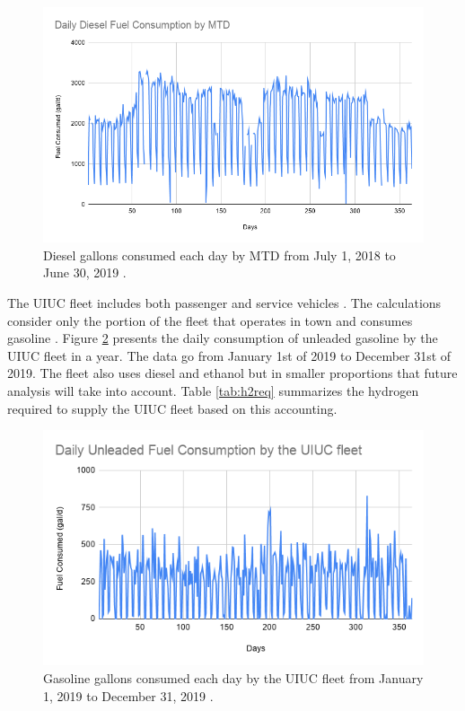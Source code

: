 \documentclass{anstrans}
\begin{document}
\begin{figure}[H]
	\centering
	\includegraphics[width=1.05\linewidth]{figures/mtd-fuel-consumption.png}
	\hfill
	\caption{Diesel gallons consumed each day by MTD from July 1, 2018 to June 30, 2019 \cite{mtd_irecords_2019}.}
	\label{fig:mtdfuel}
\end{figure}

The UIUC fleet includes both passenger and service vehicles \cite{uiuc_institute_for_sustainability_energy_and_environment_increase_2020}. The calculations consider only the portion of the fleet that operates in town and consumes gasoline \cite{uiuc_personnal_communication}. Figure \ref{fig:uiucfuel} presents the daily consumption of unleaded gasoline by the UIUC fleet in a year. The data go from January 1st of 2019 to December 31st of 2019. The fleet also uses diesel and ethanol but in smaller proportions that future analysis will take into account.
Table \ref{tab:h2req} summarizes the hydrogen required to supply the UIUC fleet based on this accounting.

\begin{figure}[H]
	\centering
	\includegraphics[width=0.95\linewidth]{figures/uiuc-unleaded.png}
	\hfill
	\caption{Gasoline gallons consumed each day by the UIUC fleet from January 1, 2019 to December 31, 2019 \cite{uiuc_personnal_communication}.}
	\label{fig:uiucfuel}
\end{figure}
\end{document}
